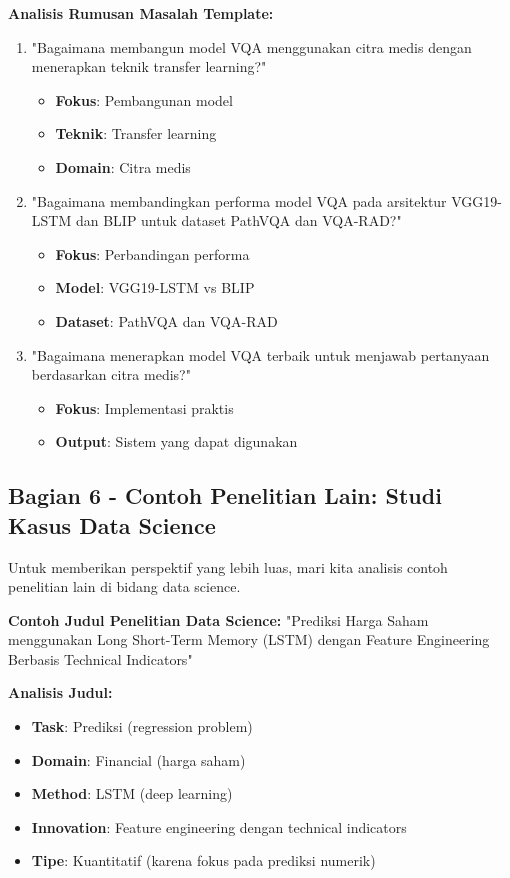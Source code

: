 \textbf{Analisis Rumusan Masalah Template:}

\begin{enumerate}
    \item "Bagaimana membangun model VQA menggunakan citra medis dengan menerapkan teknik transfer learning?"
    \begin{itemize}
        \item \textbf{Fokus}: Pembangunan model
        \item \textbf{Teknik}: Transfer learning
        \item \textbf{Domain}: Citra medis
    \end{itemize}

    \item "Bagaimana membandingkan performa model VQA pada arsitektur VGG19-LSTM dan BLIP untuk dataset PathVQA dan VQA-RAD?"
    \begin{itemize}
        \item \textbf{Fokus}: Perbandingan performa
        \item \textbf{Model}: VGG19-LSTM vs BLIP
        \item \textbf{Dataset}: PathVQA dan VQA-RAD
    \end{itemize}

    \item "Bagaimana menerapkan model VQA terbaik untuk menjawab pertanyaan berdasarkan citra medis?"
    \begin{itemize}
        \item \textbf{Fokus}: Implementasi praktis
        \item \textbf{Output}: Sistem yang dapat digunakan
    \end{itemize}
\end{enumerate}

\subsection*{Bagian 6 - Contoh Penelitian Lain: Studi Kasus Data Science}

Untuk memberikan perspektif yang lebih luas, mari kita analisis contoh penelitian lain di bidang data science.

\textbf{Contoh Judul Penelitian Data Science:}
"Prediksi Harga Saham menggunakan Long Short-Term Memory (LSTM) dengan Feature Engineering Berbasis Technical Indicators"

\textbf{Analisis Judul:}
\begin{itemize}
    \item \textbf{Task}: Prediksi (regression problem)
    \item \textbf{Domain}: Financial (harga saham)
    \item \textbf{Method}: LSTM (deep learning)
    \item \textbf{Innovation}: Feature engineering dengan technical indicators
    \item \textbf{Tipe}: Kuantitatif (karena fokus pada prediksi numerik)
\end{itemize}

